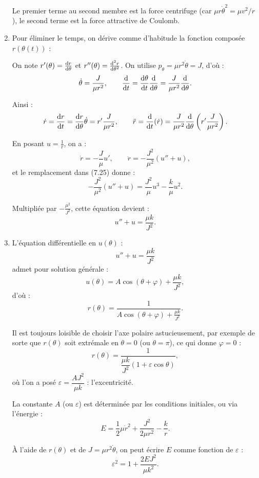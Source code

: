 \documentclass[a4paper,10pt]{report}
\begin{document}
\begin{enumerate}
	 Le premier terme au second membre est la force centrifuge (car $\mu r \dot{\theta}^2 = \mu v^2 / r$), le second terme est la force attractive de Coulomb.
	 
	 \item
	 
	 Pour éliminer le temps, on dérive comme d'habitude la fonction composée $r(\theta(t))$ :
	 
	 On note $r'(\theta) = \dv{r}{\theta}$ et $r''(\theta) = \dv[2]{r}{\theta}$. On utilise $p_\theta = \mu r^2 \dot{\theta} = J$, d'où :
	 \[
	 \dot{\theta} = \frac{J}{\mu r^2}, \qquad \dv{}{t} = \dv{\theta}{t} \dv{}{\theta} = \frac{J}{\mu r^2} \dv{}{\theta}.
	 \]
	 
	 Ainsi :
	 \[
	 \dot{r} = \dv{r}{t} = \dv{r}{\theta} \dot{\theta} = r' \frac{J}{\mu r^2}, \qquad
	 \ddot{r} = \dv{t}(\dot{r}) = \frac{J}{\mu r^2} \dv{\theta} \left( r' \frac{J}{\mu r^2} \right).
	 \]
	 
	 En posant $u = \frac{1}{r}$, on a :
	 \[
	 \dot{r} = -\frac{J}{\mu} u', \qquad \ddot{r} = -\frac{J^2}{\mu^2} \left( u'' + u \right),
	 \]
	 et le remplacement dans (7.25) donne :
	 \[
	 - \frac{J^2}{\mu^2} (u'' + u) = \frac{J^2}{\mu} u^3 - \frac{k}{\mu} u^2.
	 \]
	 
	 Multipliée par $- \frac{\mu^2}{J^2}$, cette équation devient :
	 \[
	 u'' + u = \frac{\mu k}{J^2}.
	 \]
	 
	 \item
	 
	 L'équation différentielle en $u(\theta)$ :
	 \[
	 u'' + u = \frac{\mu k}{J^2}
	 \]
	 admet pour solution générale :
	 \[
	 u(\theta) = A \cos(\theta + \varphi) + \frac{\mu k}{J^2},
	 \]
	 d'où :
	 \[
	 r(\theta) = \frac{1}{A \cos(\theta + \varphi) + \frac{\mu k}{J^2}}.
	 \]
	 
	 Il est toujours loisible de choisir l’axe polaire astucieusement, par exemple de sorte que $r(\theta)$ soit extrémale en $\theta = 0$ (ou $\theta = \pi$), ce qui donne $\varphi = 0$ :
	 \begin{equation}
	 	r(\theta) = \frac{1}{\dfrac{\mu k}{J^2} (1 + \varepsilon \cos \theta)}, \tag{7.26}
	 \end{equation}
	 où l'on a posé $\varepsilon = \dfrac{A J^2}{\mu k}$ : l'excentricité.
	 
	 La constante $A$ (ou $\varepsilon$) est déterminée par les conditions initiales, ou via l'énergie :
	 \[
	 E = \frac{1}{2} \mu \dot{r}^2 + \frac{J^2}{2\mu r^2} - \frac{k}{r}.
	 \]
	 
	 À l'aide de $r(\theta)$ et de $J = \mu r^2 \dot{\theta}$, on peut écrire $E$ comme fonction de $\varepsilon$ :
	 \[
	 \varepsilon^2 = 1 + \frac{2 E J^2}{\mu k^2}. \tag{7.27}
	 \]
	 

\end{enumerate}
\end{document}

